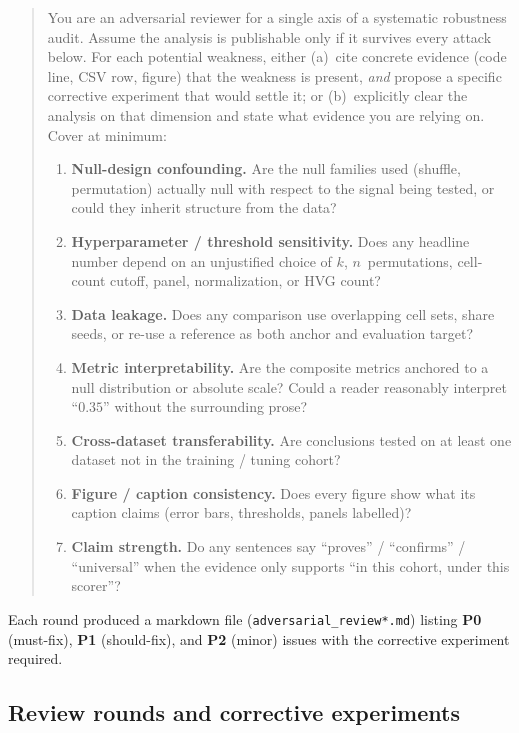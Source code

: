 \documentclass[a4paper,11pt]{article}
\begin{document}
\begin{quote}\small
You are an adversarial reviewer for a single axis of a systematic
robustness audit. Assume the analysis is publishable only if it
survives every attack below. For each potential weakness, either
(a)~cite concrete evidence (code line, CSV row, figure) that the
weakness is present, \emph{and} propose a specific corrective
experiment that would settle it; or (b)~explicitly clear the analysis
on that dimension and state what evidence you are relying on.
Cover at minimum:
\begin{enumerate}
\item \textbf{Null-design confounding.} Are the null families used
  (shuffle, permutation) actually null with respect to the signal
  being tested, or could they inherit structure from the data?
\item \textbf{Hyperparameter / threshold sensitivity.} Does any
  headline number depend on an unjustified choice of $k$,
  $n$~permutations, cell-count cutoff, panel, normalization, or HVG
  count?
\item \textbf{Data leakage.} Does any comparison use overlapping cell
  sets, share seeds, or re-use a reference as both anchor and
  evaluation target?
\item \textbf{Metric interpretability.} Are the composite metrics
  anchored to a null distribution or absolute scale? Could a reader
  reasonably interpret ``$0.35$'' without the surrounding prose?
\item \textbf{Cross-dataset transferability.} Are conclusions tested
  on at least one dataset not in the training / tuning cohort?
\item \textbf{Figure / caption consistency.} Does every figure show
  what its caption claims (error bars, thresholds, panels labelled)?
\item \textbf{Claim strength.} Do any sentences say ``proves'' /
  ``confirms'' / ``universal'' when the evidence only supports
  ``in this cohort, under this scorer''?
\end{enumerate}
\end{quote}

Each round produced a markdown file
(\texttt{adversarial\_review*.md}) listing \textbf{P0} (must-fix),
\textbf{P1} (should-fix), and \textbf{P2} (minor) issues with the
corrective experiment required.

\subsection{Review rounds and corrective experiments}
\end{document}
